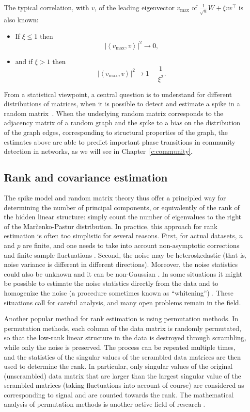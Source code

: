 The typical correlation, with $v$, of the leading eigenvector $v_{\max}$ of $\frac1{\sqrt{n}}W+\xi vv^\top  $ is also known:
\begin{itemize}
 \item If $\xi \leq 1$ then
 \[
  \left| \left\langle v_{\max},v \right\rangle \right|^2 \to 0,
 \]
 \item and if $\xi > 1$ then
 \[
    \left| \left\langle v_{\max},v \right\rangle \right|^2 \to 1-\frac{1}{\xi^2}.
 \]
\end{itemize}

From a statistical viewpoint, a central question is to understand for different distributions of matrices, when it is possible to detect and estimate a spike in a random matrix~\cite{AlexAmeliaAfonsoAnkur_PCA}. When the underlying random matrix corresponds to the adjacency matrix of a random graph and the spike to a bias on the distribution of the graph edges, corresponding to structural properties of the graph, the estimates above are able to predict important phase transitions in community detection in networks, as we will see in Chapter~\ref{c:community}.

\subsection{Rank and covariance estimation}
The spike model and random matrix theory thus offer a principled way for determining the number of principal components, or equivalently of the rank of the hidden linear structure: simply count the number of eigenvalues to the right of the Mar\v{c}enko-Pastur distribution. In practice, this approach for rank estimation is often too simplistic for several reasons. First, for actual datasets, $n$ and $p$ are finite, and one needs to take into account non-asymptotic corrections and finite sample fluctuations \cite{kritchman2008determining,kritchman2009non}. Second, the noise may be heteroskedastic (that is, noise variance is different in different directions). Moreover, the noise statistics could also be unknown and it can be non-Gaussian \cite{liu2018pca}. In some situations it might be possible to estimate the noise statistics directly from the data and to homogenize the noise (a procedure sometimes known as ``whitening'') \cite{leeb2018optimal}. These situations call for careful analysis, and many open problems remain in the field.

Another popular method for rank estimation is using permutation methods. In permutation methods, each column of the data matrix is randomly permutated, so that the low-rank linear structure in the data is destroyed through scrambling, while only the noise is preserved. The process can be repeated multiple times, and the statistics of the singular values of the scrambled data matrices are then used to determine the rank. In particular, only singular values of the original (unscrambled) data matrix that are larger than the largest singular value of the scrambled matrices (taking fluctuations into account of course) are considered as corresponding to signal and are counted towards the rank. The mathematical analysis of permutation methods is another active field of research \cite{dobriban2017permutation,dobriban2018deterministic}.

